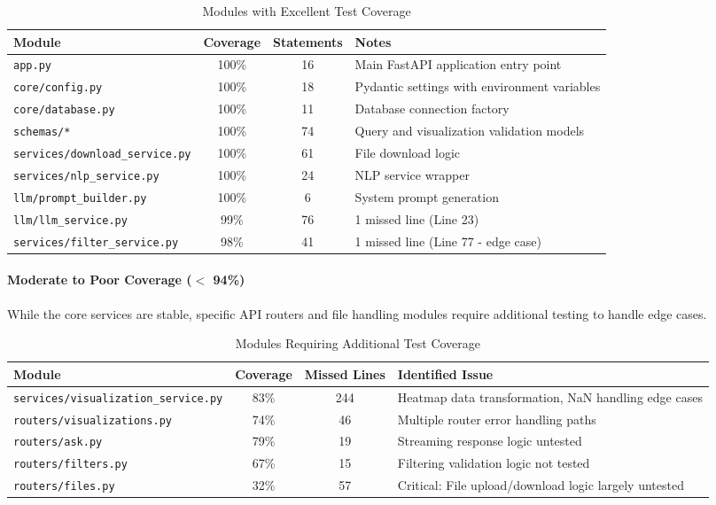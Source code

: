 \documentclass[12pt, titlepage]{article}
\begin{document}
\begin{table}[h!]
\centering
\caption{Modules with Excellent Test Coverage}
\label{tab:coverage_excellent}
\footnotesize
\begin{tabularx}{\textwidth}{|l|c|c|X|}
\hline
\textbf{Module} & \textbf{Coverage} & \textbf{Statements} & \textbf{Notes} \\ \hline
\texttt{app.py} & 100\% & 16 & Main FastAPI application entry point \\ \hline
\texttt{core/config.py} & 100\% & 18 & Pydantic settings with environment variables \\ \hline
\texttt{core/database.py} & 100\% & 11 & Database connection factory \\ \hline
\texttt{schemas/*} & 100\% & 74 & Query and visualization validation models \\ \hline
\texttt{services/download\_service.py} & 100\% & 61 & File download logic \\ \hline
\texttt{services/nlp\_service.py} & 100\% & 24 & NLP service wrapper \\ \hline
\texttt{llm/prompt\_builder.py} & 100\% & 6 & System prompt generation \\ \hline
\texttt{llm/llm\_service.py} & 99\% & 76 & 1 missed line (Line 23) \\ \hline
\texttt{services/filter\_service.py} & 98\% & 41 & 1 missed line (Line 77 - edge case) \\ \hline
\end{tabularx}
\end{table}

\paragraph{Moderate to Poor Coverage ($<$ 94\%)}
While the core services are stable, specific API routers and file handling modules require additional testing to handle edge cases.

\begin{table}[h]
\centering
\caption{Modules Requiring Additional Test Coverage}
\label{tab:coverage_poor}
\footnotesize
\begin{tabularx}{\textwidth}{|l|c|c|X|}
\hline
\textbf{Module} & \textbf{Coverage} & \textbf{Missed Lines} & \textbf{Identified Issue} \\ \hline
\texttt{services/visualization\_service.py} & 83\% & 244 & Heatmap data transformation, NaN handling edge cases \\ \hline
\texttt{routers/visualizations.py} & 74\% & 46 & Multiple router error handling paths \\ \hline
\texttt{routers/ask.py} & 79\% & 19 & Streaming response logic untested \\ \hline
\texttt{routers/filters.py} & 67\% & 15 & Filtering validation logic not tested \\ \hline
\texttt{routers/files.py} & 32\% & 57 & Critical: File upload/download logic largely untested \\ \hline
\end{tabularx}
\end{table}
\end{document}
